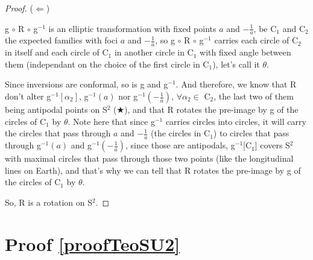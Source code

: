 \begin{proof}
\noindent($\Leftarrow$)

g $\circ$ R $\circ$ g$^{-1}$ is an elliptic transformation with fixed points $a$ and $-\frac{1}{a}$, be C$_1$ and C$_2$ the expected families with foci $a$ and $-\frac{1}{a}$, so g $\circ$ R $\circ$ g$^{-1}$ carries each circle of C$_2$ in itself and each circle of C$_1$ in another circle in C$_1$ with fixed angle between them (independant on the choice of the first circle in C$_1$), let's call it $\theta$.

Since inversions are conformal, so is g and g$^{-1}$. And therefore, we know that R don't alter g$^{-1}[\alpha_2]$, g$^{-1}(a)$ nor g$^{-1}\left(-\frac{1}{a}\right)$, $\forall \alpha_2 \in$ C$_2$, the last two of them being antipodal points on S$^2$ ($\bigstar$), and that R rotates the pre-image by g of the circles of C$_1$ by $\theta$. Note here that since g$^{-1}$ carries circles into circles, it will carry the circles that pass through $a$ and $-\frac{1}{a}$ (the circles in C$_1$) to circles that pass through g$^{-1}(a)$ and g$^{-1}\left(-\frac{1}{a}\right)$, since those are antipodals, g$^{-1}$[C$_1$] covers S$^2$ with maximal circles that pass through those two points (like the longitudinal lines on Earth), and that's why we can tell that R rotates the pre-image by g of the circles of C$_1$ by $\theta$.

So, R is a rotation on S$^2$.
\end{proof}


\section{Proof \ref{proofTeoSU2}}

